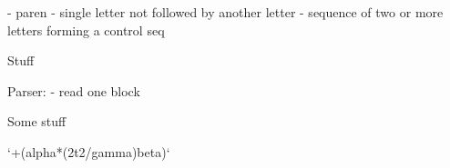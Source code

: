 


     - paren 
     - single letter not followed by another letter
     - sequence of two or more letters forming a control seq


% 
% 

% 

Stuff


Parser:
- read one block

Some stuff






\def\foo{2\over t}
`+(alpha*\Sigma (\foo2/gamma)beta)`

\bye
